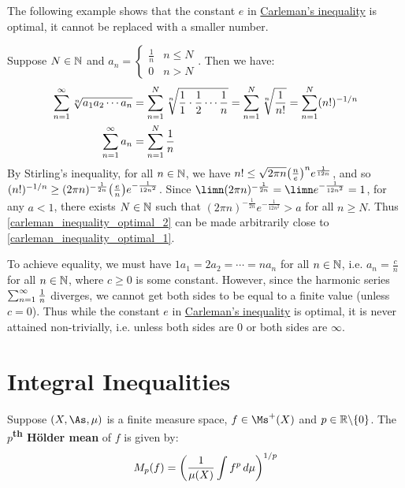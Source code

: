 \documentclass[main.tex]{subfiles}
\begin{document}
The following example shows that the constant $e$ in \hyperref[carleman_inequality]{Carleman's inequality} is optimal, it cannot be replaced with a smaller number.

\begin{example}
    Suppose $N\in\N$ and $a_n= \begin{cases} \frac{1}{n} & n\le N \\ 0 & n>N \end{cases}$. Then we have:
    \begin{align}\label{carleman_inequality_optimal_1}
        \sum_{n=1}^\infty\sqrt[n]{a_1a_2\cdots a_n}
        &= \sum_{n=1}^N \sqrt[n]{\frac{1}{1}\cdot\frac{1}{2}\cdots\frac{1}{n}}
        = \sum_{n=1}^N \sqrt[n]{\frac{1}{n!}}
        = \sum_{n=1}^N (n!)^{-1/n}\\
        \label{carleman_inequality_optimal_2}
        \sum_{n=1}^\infty a_n
        &= \sum_{n=1}^N \frac{1}{n}
    \end{align}
    By Stirling's inequality, for all $n\in\N$, we have $n!\le\sqrt{2\pi n}\qty(\frac{n}{e})^ne^{\frac{1}{12n}}$, and so $(n!)^{-1/n}\ge(2\pi n)^{-\frac{1}{2n}}\qty(\frac{e}{n})e^{-\frac{1}{12n^2}}$. Since $\limn(2\pi n)^{-\frac{1}{2n}}= \limn e^{-\frac{1}{12n^2}}=1$, for any $a<1$, there exists $N\in\N$ such that $(2\pi n)^{-\frac{1}{2n}}e^{-\frac{1}{12n^2}}>a$ for all $n\ge N$. Thus \eqref{carleman_inequality_optimal_2} can be made arbitrarily close to \eqref{carleman_inequality_optimal_1}.
\end{example}

To achieve equality, we must have $1a_1=2a_2=\cdots=na_n$ for all $n\in\N$, i.e. $a_n=\frac{c}{n}$ for all $n\in\N$, where $c\ge 0$ is some constant. However, since the harmonic series $\sum_{n=1}^\infty\frac{1}{n}$ diverges, we cannot get both sides to be equal to a finite value (unless $c=0$). Thus while the constant $e$ in \hyperref[carleman_inequality]{Carleman's inequality} is optimal, it is never attained non-trivially, i.e. unless both sides are $0$ or both sides are $\infty$.

\section{Integral Inequalities}

\begin{definition}
    Suppose $(X,\As,\mu)$ is a finite measure space, $f\in\Ms^+(X)$ and $p\in\R\exc\{0\}$. The \textbf{$p$\textsuperscript{th} Hölder mean} of $f$ is given by:
    \begin{equation*}
        M_p(f)= \qty(\frac{1}{\mu(X)}\int f^p\,d\mu)^{1/p}
    \end{equation*}
\end{definition}
\end{document}
